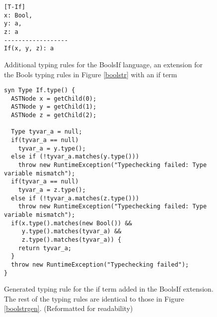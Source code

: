\documentclass[nofilelist]{cslthse-msc}
\newcommand{\CR}[1]{\textcolor{green!60!black}{[\textbf{CR}:#1]}}
\begin{document}
\begin{figure}[]
\begin{lstlisting}[]
[T-If]
x: Bool,
y: a,
z: a
------------------
If(x, y, z): a
\end{lstlisting}
  \caption{Additional typing rules for the BoolsIf language, an extension for the Bools typing rules in Figure \ref{boolstr} with an if term}
  \label{iftr}
\end{figure}
\begin{figure}[]
\begin{lstlisting}[language=jrag]
syn Type If.type() {
  ASTNode x = getChild(0);
  ASTNode y = getChild(1);
  ASTNode z = getChild(2);

  Type tyvar_a = null;
  if(tyvar_a == null)
    tyvar_a = y.type();
  else if (!tyvar_a.matches(y.type()))
    throw new RuntimeException("Typechecking failed: Type variable mismatch");
  if(tyvar_a == null)
    tyvar_a = z.type();
  else if (!tyvar_a.matches(z.type()))
    throw new RuntimeException("Typechecking failed: Type variable mismatch");
  if(x.type().matches(new Bool()) &&
     y.type().matches(tyvar_a) &&
     z.type().matches(tyvar_a)) {
    return tyvar_a;
  }
  throw new RuntimeException("Typechecking failed");
}
\end{lstlisting}
\caption{Generated typing rule for the if term added in the BoolsIf extension. The rest of the typing rules are identical to those in Figure \ref{boolstrgen}. (Reformatted for readability)
}
  \label{iftrgen}
\end{figure}
\end{document}
